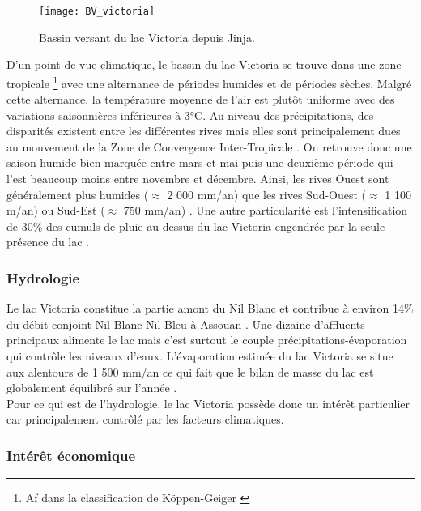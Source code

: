 \begin{figure}[h!]
\centering
\texttt{[image: BV\_victoria]}
\caption{Bassin versant du lac Victoria depuis Jinja.}
\label{bv_victoria}
\end{figure}

D'un point de vue climatique, le bassin du lac Victoria se trouve dans une zone tropicale \footnote{Af dans la classification de Köppen-Geiger \citep{beck2018}} avec une alternance de périodes humides et de périodes sèches. Malgré cette alternance, la température moyenne de l'air est plutôt uniforme avec des variations saisonnières inférieures à 3°C. Au niveau des précipitations, des disparités existent entre les différentes rives mais elles sont principalement dues au mouvement de la Zone de Convergence Inter-Tropicale \citep[ZCIT,][]{nicholson2017}. On retrouve donc une saison humide bien marquée entre mars et mai puis une deuxième période qui l'est beaucoup moins entre novembre et décembre. Ainsi, les rives Ouest sont généralement plus humides ($\approx$ 2 000 mm/an) que les rives Sud-Ouest ($\approx$ 1 100 m/an) ou Sud-Est ($\approx$ 750 mm/an) \citep{paugy2019}. Une autre particularité est l'intensification de 30\% des cumuls de pluie au-dessus du lac Victoria engendrée par la seule présence du lac \citep{sutcliffe1999}.

\subsubsection*{{\selectfont Hydrologie}}
\label{sec:hydrologie_victoria}

Le lac Victoria constitue la partie amont du Nil Blanc et contribue à environ 14\% du débit conjoint Nil Blanc-Nil Bleu à Assouan \citep{crul1995}. Une dizaine d'affluents principaux alimente le lac mais c'est surtout le couple précipitations-évaporation qui contrôle les niveaux d'eaux. L'évaporation estimée du lac Victoria se situe aux alentours de 1 500 mm/an ce qui fait que le bilan de masse du lac est globalement équilibré sur l'année \citep{vanderkelen2018a}.\\
Pour ce qui est de l'hydrologie, le lac Victoria possède donc un intérêt particulier car principalement contrôlé par les facteurs climatiques.

\subsubsection*{{\selectfont Intérêt économique}}


